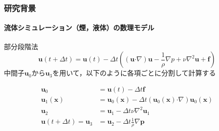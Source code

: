 \documentclass[aspectratio=169,dvipdfmx,hyperref={bookmarks=true}]{beamer}
\begin{document}

  \begin{frame}
  \frametitle{研究背景}
  \framesubtitle{流体シミュレーション（煙，液体）の数理モデル}
    \begin{block}{部分段階法}
    	\[
	\bm{u}(t + \varDelta t)  =\bm{u}(t) -\varDelta t( (\bm{u} \boldsymbol{\cdot}\nabla) \bm{u} - \frac{1}{\rho}\nabla p + \nu\nabla^2\bm{u} + \bm{f})
	\]
中間子$\bm{u}_0$から$\bm{u}_3$を用いて，以下のように各項ごとに分割して計算する

\begin{align*}
	\bm{u}_0				& =  \bm{u} (t)  - \varDelta t \bm{f} 				\\
	\bm{u}_1 (\bm{x}) 		&= \bm{u}_0 (\bm{x}) - \varDelta t (\bm{u}_0(\bm{x})  \boldsymbol{\cdot}\nabla) \bm{u}_0(\bm{x})	\\
	\bm{u}_2  		 		&=  \bm{u}_1 - \varDelta t \nu\nabla^2\bm{u}_1		\\
	\bm{u} (t + \varDelta t) = \bm{u}_3  &=  \bm{u}_2 - \varDelta t \frac{1}{\rho}\nabla \bm{p}
\end{align*}
\end{block}
\end{frame}
\end{document}
